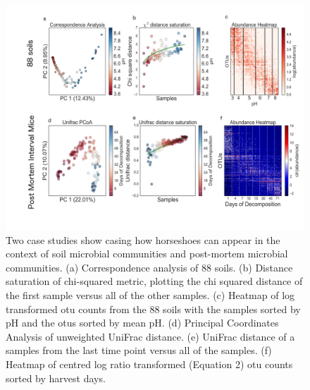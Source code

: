 \begin{figure}[H]
        \centering
        \includegraphics[width=1\textwidth]{ch2/Figure2.pdf}
        \caption[Two case studies show casing how horseshoes can appear in the context of
          soil microbial communities and post-mortem microbial communities.]
        {Two case studies show casing how horseshoes can appear in the context of soil microbial communities and post-mortem microbial communities. (a) Correspondence analysis of 88 soils.  (b) Distance saturation of chi-squared metric, plotting the chi squared distance of the first sample versus all of the other samples. (c) Heatmap of log transformed \gls{otu} counts from the 88 soils with the samples sorted by pH and the \gls{otu}s sorted by mean pH.  (d) Principal Coordinates Analysis of unweighted UniFrac distance.  (e) UniFrac distance of a samples from the last time point versus all of the samples. (f) Heatmap of centred log ratio transformed (Equation 2) \gls{otu} counts sorted by harvest days.}
        \label{figb2}
\end{figure}
